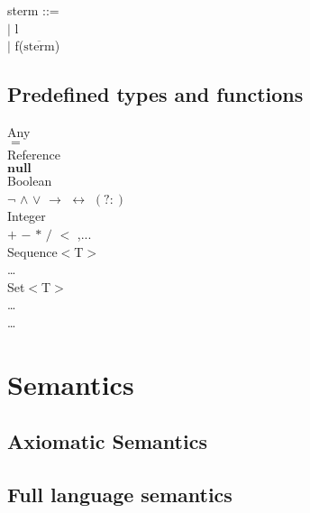 \documentclass{paper}
\begin{document}
	\begin{tabbing}
 			sterm ::= \\
 			\indent $|$ l \\
 			\indent $|$ f($\overline{\mathrm{sterm}}$) \\
	\end{tabbing}

	\subsection{Predefined types and functions}
		Any \\
		\indent $=$ \\
		Reference \\
		\indent $\textbf{null}$ \\
		Boolean \\
		\indent $\lnot$ $\land$ $\lor$ $\rightarrow$ $\leftrightarrow$ $( ? : )$ \\
		Integer \\
		\indent	$+$ $-$ $*$ $/$ $<$ ,... \\
		Sequence$<$T$>$ \\
		\indent	\dots \\
		Set$<$T$>$ \\
		\indent	\dots \\
		\dots \\

	\section{Semantics}
	
	\subsection{Axiomatic Semantics}

	
	\subsection{Full language semantics}
\end{document}
